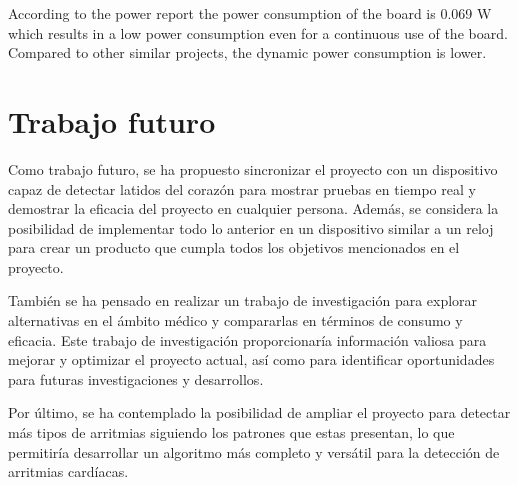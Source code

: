 According to the power report the power consumption of the board is 0.069 W which results in a low power consumption even for a continuous use of the board.
Compared to other similar projects, the dynamic power consumption is lower.


\chapter{Trabajo futuro}

Como trabajo futuro, se ha propuesto sincronizar el proyecto con un dispositivo capaz de detectar latidos del corazón para mostrar pruebas en tiempo real y demostrar la eficacia del proyecto en cualquier persona. Además, se considera la posibilidad de implementar todo lo anterior en un dispositivo similar a un reloj para crear un producto que cumpla todos los objetivos mencionados en el proyecto.

También se ha pensado en realizar un trabajo de investigación para explorar alternativas en el ámbito médico y compararlas en términos de consumo y eficacia. Este trabajo de investigación proporcionaría información valiosa para mejorar y optimizar el proyecto actual, así como para identificar oportunidades para futuras investigaciones y desarrollos.

Por último, se ha contemplado la posibilidad de ampliar el proyecto para detectar más tipos de arritmias siguiendo los patrones que estas presentan, lo que permitiría desarrollar un algoritmo más completo y versátil para la detección de arritmias cardíacas.
